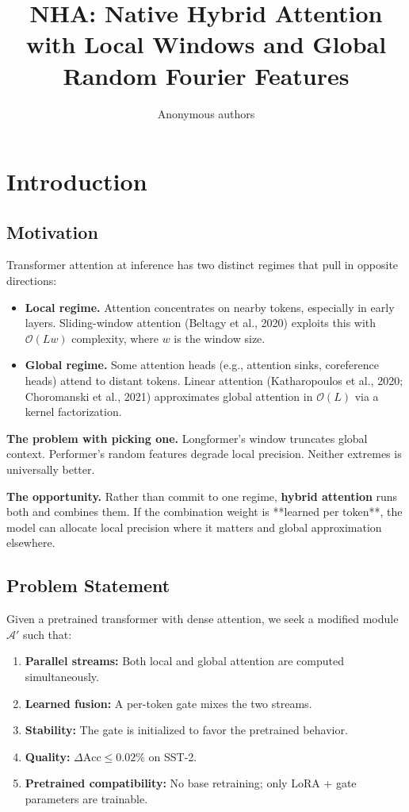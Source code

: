 \title{\textbf{NHA: Native Hybrid Attention with Local Windows and Global Random Fourier Features}}

\author{Anonymous authors}



\section{Introduction}

\subsection{Motivation}

Transformer attention at inference has two distinct regimes that pull in 
opposite directions:

\begin{itemize}
\item \textbf{Local regime.} Attention concentrates on nearby tokens, especially in
  early layers. Sliding-window attention (Beltagy et al., 2020) exploits this
  with $\mathcal{O}(L w)$ complexity, where $w$ is the window size.

\item \textbf{Global regime.} Some attention heads (e.g., attention sinks, coreference
  heads) attend to distant tokens. Linear attention (Katharopoulos et al.,
  2020; Choromanski et al., 2021) approximates global attention in
  $\mathcal{O}(L)$ via a kernel factorization.

\end{itemize}
\textbf{The problem with picking one.} Longformer's window truncates global 
context. Performer's random features degrade local precision. Neither 
extremes is universally better.

\textbf{The opportunity.} Rather than commit to one regime, \textbf{hybrid attention} 
runs both and combines them. If the combination weight is **learned per 
token**, the model can allocate local precision where it matters and global 
approximation elsewhere.

\subsection{Problem Statement}

Given a pretrained transformer with dense attention, we seek a modified 
module $\mathcal{A}'$ such that:

\begin{enumerate}
\item \textbf{Parallel streams:} Both local and global attention are computed
  simultaneously.
\item \textbf{Learned fusion:} A per-token gate mixes the two streams.
\item \textbf{Stability:} The gate is initialized to favor the pretrained behavior.
\item \textbf{Quality:} $\Delta\text{Acc} \leq 0.02\%$ on SST-2.
\item \textbf{Pretrained compatibility:} No base retraining; only LoRA + gate
  parameters are trainable.

\end{enumerate}
